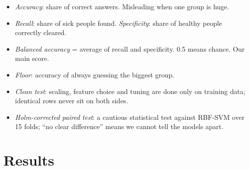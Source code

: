 \documentclass[11pt,a4paper]{article}
\begin{document}
\begin{itemize}[leftmargin=1.5em,nosep]
\item \emph{Accuracy}: share of correct answers. Misleading when one group is huge.
\item \emph{Recall}: share of sick people found. \emph{Specificity}: share of healthy people correctly cleared.
\item \emph{Balanced accuracy} = average of recall and specificity. 0.5 means chance. Our main score.
\item \emph{Floor}: accuracy of always guessing the biggest group.
\item \emph{Clean test}: scaling, feature choice and tuning are done only on training data; identical rows never sit on both sides.
\item \emph{Holm-corrected paired test}: a cautious statistical test against RBF-SVM over 15 folds; ``no clear difference'' means we cannot tell the models apart.
\end{itemize}

\section{Results}
\end{document}
